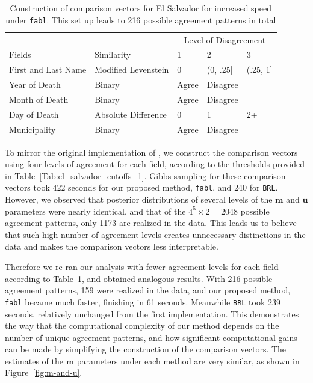 \documentclass[12pt,letterpaper]{article}
\newcommand{\1}[1]{\mathbb{I}\!\left[#1\right]} %
\begin{document}
\begin{table}
	\centering
	\begin{tabular}[h!]{ll|lll}
		\hline
		\multicolumn{2}{c|}{ } & \multicolumn{3}{c}{Level of Disagreement} \\
		\cline{3-5}
		Fields & Similarity & 1 & 2 & 3\\
		\hline
		First and Last Name & Modified Levenstein & 0 & (0, .25] & (.25, 1]\\
		\hline
		Year of Death & Binary & Agree & Disagree & \\
		\hline
		Month of Death & Binary & Agree & Disagree & \\
		\hline
		Day of Death & Absolute Difference & 0 & 1 & 2+\\
		\hline
		Municipality & Binary & Agree & Disagree & \\
		\hline
	\end{tabular}
\caption{Construction of comparison vectors for El Salvador for increased speed under \texttt{fabl}. This set up leads to 216 possible agreement patterns in total}\label{Tab:el_salvador_cutoffs_2}
\end{table}

To mirror the original implementation of \cite{sadinle_bayesian_2017}, we construct the comparison
vectors using four levels of agreement for each field, according to the
thresholds provided in Table~\ref{Tab:el_salvador_cutoffs_1}. Gibbs sampling for these comparison vectors took 422 seconds for our proposed
method, \texttt{fabl}, and 240 for \texttt{BRL}. However, we observed that posterior
distributions of several levels of the \(\mathbf{m}\) and \(\mathbf{u}\)
parameters were nearly identical, and that of the
\(4^5 \times 2 = 2048\) possible agreement patterns, only 1173 are
realized in the data. This leads us to believe that such high number of
agreement levels creates unnecessary distinctions in the data and makes
the comparison vectors less interpretable. 

Therefore we re-ran our analysis with fewer agreement levels for each field according to Table~\ref{Tab:el_salvador_cutoffs_2}, and
obtained analogous results. With 216 possible agreement patterns, 159
were realized in the data, and our proposed method, \texttt{fabl} became much faster,
finishing in 61 seconds. Meanwhile \texttt{BRL} took 239 seconds,
relatively unchanged from the first implementation. This demonstrates
the way that the computational complexity of our method depends on the
number of unique agreement patterns, and how significant computational
gains can be made by simplifying the construction of the comparison
vectors. The estimates of the \(\mathbf{m}\) parameters under each method are very similar, as shown in
Figure~\ref{fig:m-and-u}.
\end{document}

